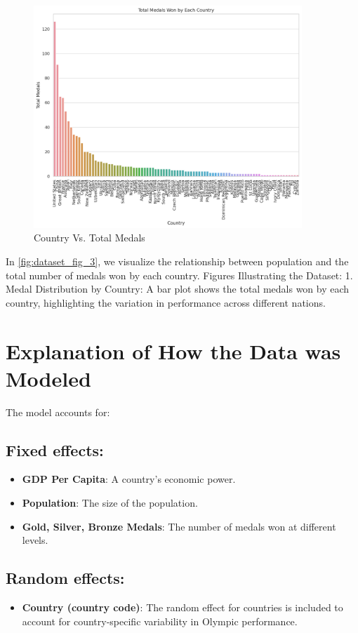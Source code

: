 \documentclass[a4paper,12pt]{article}
\begin{document}
\begin{figure}[H]
    \centering
    \includegraphics[width=0.9\textwidth]{images/plot_3.png}
    \caption{Country Vs. Total Medals}
    \label{fig:dataset_fig_3}
\end{figure}
In \autoref{fig:dataset_fig_3}, we visualize the relationship between population and the total number of medals won by each country.
\newline
Figures Illustrating the Dataset:
1. Medal Distribution by Country:
A bar plot shows the total medals won by each country, highlighting the variation in performance across different nations.



\section{Explanation of How the Data was Modeled}
The model accounts for:

\subsection{Fixed effects:}
\begin{itemize}
    \item \textbf{GDP Per Capita}: A country's economic power.
    \item \textbf{Population}: The size of the population.
    \item \textbf{Gold, Silver, Bronze Medals}: The number of medals won at different levels.
\end{itemize}

\subsection{Random effects:}
\begin{itemize}
    \item \textbf{Country (country code)}: The random effect for countries is included to account for country-specific variability in Olympic performance.
\end{itemize}
\end{document}
